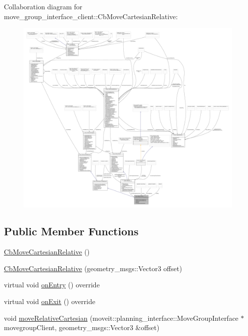 Collaboration diagram for move\+\_\+group\+\_\+interface\+\_\+client\+:\+:Cb\+Move\+Cartesian\+Relative\+:
\nopagebreak
\begin{figure}[H]
\begin{center}
\leavevmode
\includegraphics[width=350pt]{classmove__group__interface__client_1_1CbMoveCartesianRelative__coll__graph}
\end{center}
\end{figure}
\subsection*{Public Member Functions}
\begin{DoxyCompactItemize}
\item 
\hyperlink{classmove__group__interface__client_1_1CbMoveCartesianRelative_acb71f733e58a5f5c2d8e4cc5dad9768f}{Cb\+Move\+Cartesian\+Relative} ()
\item 
\hyperlink{classmove__group__interface__client_1_1CbMoveCartesianRelative_afae824d1c68eaae5923166606ddb09f6}{Cb\+Move\+Cartesian\+Relative} (geometry\+\_\+msgs\+::\+Vector3 offset)
\item 
virtual void \hyperlink{classmove__group__interface__client_1_1CbMoveCartesianRelative_a549d1612f552cab64208c37b7e383e1c}{on\+Entry} () override
\item 
virtual void \hyperlink{classmove__group__interface__client_1_1CbMoveCartesianRelative_a100d2d75fa5d74cc5b15087100658fb8}{on\+Exit} () override
\item 
void \hyperlink{classmove__group__interface__client_1_1CbMoveCartesianRelative_a85b6b1c8738c372174dff8fd98ec1b7a}{move\+Relative\+Cartesian} (moveit\+::planning\+\_\+interface\+::\+Move\+Group\+Interface $\ast$movegroup\+Client, geometry\+\_\+msgs\+::\+Vector3 \&offset)
\end{DoxyCompactItemize}
